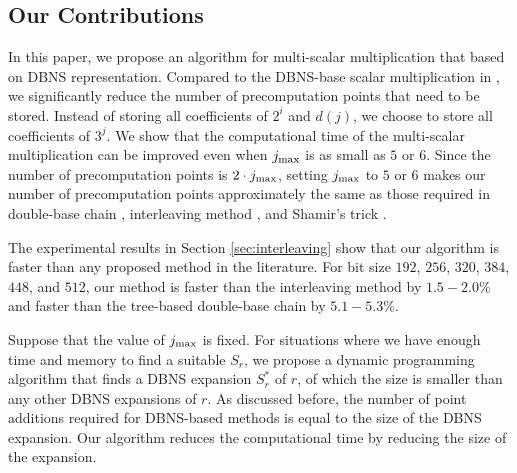 \subsection{Our Contributions}

In this paper, we propose an algorithm for multi-scalar multiplication that based on DBNS representation.
Compared to the DBNS-base scalar multiplication in \cite{MH09},
we significantly reduce the number of precomputation points that need to be stored.
Instead of storing all coefficients of $2^i$ and $d(j)$, we choose to store all coefficients of $3^j$.
We show that the computational time of the multi-scalar multiplication can be improved even when $j_{\rm max}$ is as small as $5$ or $6$.
Since the number of precomputation points is $2 \cdot j_{\rm max}$,
setting $j_{\rm max}$ to $5$ or $6$ makes our number of precomputation points approximately the same as those required in
double-base chain \cite{experiment,DKS09}, interleaving method \cite{interleaving}, and Shamir's trick \cite{enlarged4}.

The experimental results in Section \ref{sec:interleaving} show that our algorithm is faster than any proposed method in the literature.
For bit size $192$, $256$, $320$, $384$, $448$, and $512$,
our method is faster than the interleaving method by $1.5 - 2.0\%$
and faster than the tree-based double-base chain by $5.1 - 5.3\%$.

Suppose that the value of $j_{\rm max}$ is fixed.
For situations where we have enough time and memory to find a suitable $S_r$,
we propose a dynamic programming algorithm that finds a DBNS expansion $S^*_r$ of $r$, of which the size is smaller than any other DBNS expansions of $r$.
As discussed before, the number of point additions required for DBNS-based methods is equal to the size of the DBNS expansion.
Our algorithm reduces the computational time by reducing the size of the expansion.


